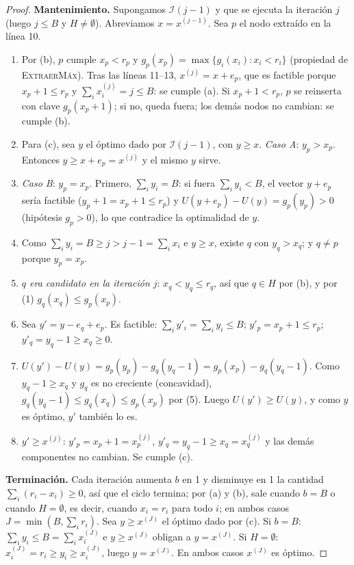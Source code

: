 \begin{proof}
\textbf{Mantenimiento.} Supongamos $\mathcal{I}(j-1)$ y que se ejecuta la iteración $j$ (luego $j\le B$ y $H\ne\emptyset$). Abreviamos $x=x^{(j-1)}$. Sea $p$ el nodo extraído en la línea 10.
\begin{enumerate}[label=(\arabic*)]
\item Por (b), $p$ cumple $x_p<r_p$ y $g_p(x_p)=\max\{g_i(x_i): x_i<r_i\}$ (propiedad de \textsc{ExtraerMáx}). Tras las líneas 11–13, $x^{(j)}=x+e_p$, que es factible porque $x_p+1\le r_p$ y $\sum_i x^{(j)}_i=j\le B$: se cumple (a). Si $x_p+1<r_p$, $p$ se reinserta con clave $g_p(x_p+1)$; si no, queda fuera; los demás nodos no cambian: se cumple (b).
\item Para (c), sea $y$ el óptimo dado por $\mathcal{I}(j-1)$, con $y\ge x$. \emph{Caso A}: $y_p>x_p$. Entonces $y\ge x+e_p=x^{(j)}$ y el mismo $y$ sirve.
\item \emph{Caso B}: $y_p=x_p$. Primero, $\sum_iy_i=B$: si fuera $\sum_iy_i<B$, el vector $y+e_p$ sería factible ($y_p+1=x_p+1\le r_p$) y $U(y+e_p)-U(y)=g_p(y_p)>0$ (hipótesis $g_p>0$), lo que contradice la optimalidad de $y$.
\item Como $\sum_iy_i=B\ge j>j-1=\sum_ix_i$ e $y\ge x$, existe $q$ con $y_q>x_q$; y $q\ne p$ porque $y_p=x_p$.
\item \emph{$q$ era candidato en la iteración $j$}: $x_q<y_q\le r_q$, así que $q\in H$ por (b), y por (1) $g_q(x_q)\le g_p(x_p)$.
\item Sea $y'=y-e_q+e_p$. Es factible: $\sum_iy'_i=\sum_iy_i\le B$; $y'_p=x_p+1\le r_p$; $y'_q=y_q-1\ge x_q\ge 0$.
\item $U(y')-U(y)=g_p(y_p)-g_q(y_q-1)=g_p(x_p)-g_q(y_q-1)$. Como $y_q-1\ge x_q$ y $g_q$ es no creciente (concavidad), $g_q(y_q-1)\le g_q(x_q)\le g_p(x_p)$ por (5). Luego $U(y')\ge U(y)$, y como $y$ es óptimo, $y'$ también lo es.
\item $y'\ge x^{(j)}$: $y'_p=x_p+1=x^{(j)}_p$, $y'_q=y_q-1\ge x_q=x^{(j)}_q$ y las demás componentes no cambian. Se cumple (c).
\end{enumerate}

\textbf{Terminación.} Cada iteración aumenta $b$ en 1 y disminuye en 1 la cantidad $\sum_i(r_i-x_i)\ge0$, así que el ciclo termina; por (a) y (b), sale cuando $b=B$ o cuando $H=\emptyset$, es decir, cuando $x_i=r_i$ para todo $i$; en ambos casos $J=\min(B,\sum_ir_i)$. Sea $y\ge x^{(J)}$ el óptimo dado por (c).
Si $b=B$: $\sum_iy_i\le B=\sum_ix_i^{(J)}$ e $y\ge x^{(J)}$ obligan a $y=x^{(J)}$.
Si $H=\emptyset$: $x_i^{(J)}=r_i\ge y_i\ge x_i^{(J)}$, luego $y=x^{(J)}$.
En ambos casos $x^{(J)}$ es óptimo.
\end{proof}

